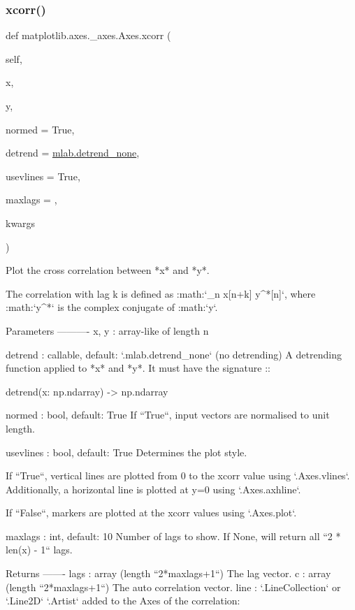 \begin{DoxyVerb}
\subsubsection{\texorpdfstring{xcorr()}{xcorr()}}
{\footnotesize\ttfamily def matplotlib.\+axes.\+\_\+axes.\+Axes.\+xcorr (\begin{DoxyParamCaption}\item[{}]{self,  }\item[{}]{x,  }\item[{}]{y,  }\item[{}]{normed = {\ttfamily True},  }\item[{}]{detrend = {\ttfamily \hyperlink{namespacematplotlib_1_1mlab_a359979aa8e0e635738648ca88ebd5e1d}{mlab.\+detrend\+\_\+none}},  }\item[{}]{usevlines = {\ttfamily True},  }\item[{}]{maxlags = {},  }\item[{}]{kwargs }\end{DoxyParamCaption})}

\begin{DoxyVerb}Plot the cross correlation between *x* and *y*.

The correlation with lag k is defined as
:math:`\sum_n x[n+k] \cdot y^*[n]`, where :math:`y^*` is the complex
conjugate of :math:`y`.

Parameters
----------
x, y : array-like of length n

detrend : callable, default: `.mlab.detrend_none` (no detrending)
    A detrending function applied to *x* and *y*.  It must have the
    signature ::

detrend(x: np.ndarray) -> np.ndarray

normed : bool, default: True
    If ``True``, input vectors are normalised to unit length.

usevlines : bool, default: True
    Determines the plot style.

    If ``True``, vertical lines are plotted from 0 to the xcorr value
    using `.Axes.vlines`. Additionally, a horizontal line is plotted
    at y=0 using `.Axes.axhline`.

    If ``False``, markers are plotted at the xcorr values using
    `.Axes.plot`.

maxlags : int, default: 10
    Number of lags to show. If None, will return all ``2 * len(x) - 1``
    lags.

Returns
-------
lags : array (length ``2*maxlags+1``)
    The lag vector.
c : array  (length ``2*maxlags+1``)
    The auto correlation vector.
line : `.LineCollection` or `.Line2D`
    `.Artist` added to the Axes of the correlation:


\end{DoxyVerb}
\end{DoxyVerb}
